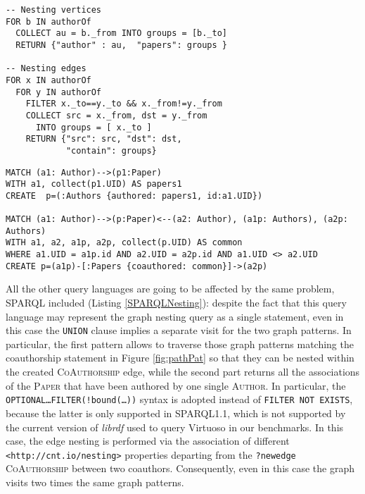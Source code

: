 \begin{lstfloat}[!t]
\begin{lstlisting}[caption={Graph Nesting in ArangoDB using AQL as a query lanugage. Please note that all the fields marked with an underscore represent externally indexed structures and. Therefore, only external indices are used within the query plan.},language=AQL,frameround=fttt,frame=trBL,tabsize=2,mathescape=true,label=AQLQueryNesting]
-- Nesting vertices
FOR b IN authorOf 
  COLLECT au = b._from INTO groups = [b._to] 
  RETURN {"author" : au,  "papers": groups }
	
-- Nesting edges
FOR x IN authorOf 
  FOR y IN authorOf 
    FILTER x._to==y._to && x._from!=y._from 
    COLLECT src = x._from, dst = y._from 
      INTO groups = [ x._to ] 
    RETURN {"src": src, "dst": dst, 
            "contain": groups}
\end{lstlisting}
	
\begin{lstlisting}[caption={Graph Nesting in Neo4J using Cypher as a Query Language. Please note that, even in this case, is it not possible to return one single nested graph immediately, and hence the nested vertices must be created before creating the nested edges. This implies that a greater number of joins is required to associate the previously nested data to the original operand.},language=Cypher,frameround=fttt,frame=trBL,mathescape=true,label=Neo4JQuery]
MATCH (a1: Author)-->(p1:Paper) 
WITH a1, collect(p1.UID) AS papers1 
CREATE  p=(:Authors {authored: papers1, id:a1.UID})
	
MATCH (a1: Author)-->(p:Paper)<--(a2: Author), (a1p: Authors), (a2p: Authors)
WITH a1, a2, a1p, a2p, collect(p.UID) AS common
WHERE a1.UID = a1p.id AND a2.UID = a2p.id AND a1.UID <> a2.UID
CREATE p=(a1p)-[:Papers {coauthored: common}]->(a2p)
\end{lstlisting}
\end{lstfloat}


All the other query languages are going to be affected by the same problem, SPARQL included (Listing \ref{SPARQLNesting}): despite the fact that this query language may represent the graph nesting query as a single statement, even in this case the \texttt{UNION} clause implies a separate visit for the two graph patterns. In particular, the first pattern allows to traverse those graph patterns matching the coauthorship statement in Figure \ref{fig:pathPat} so that they can be nested within the created \textsc{CoAuthorship} edge, while the second part returns all the associations of the \textsc{Paper} that have been authored by one single \textsc{Author}. In particular, the \texttt{OPTIONAL\dots FILTER(!bound(\dots))} syntax is adopted instead of \texttt{FILTER NOT EXISTS}, because the latter is only supported in SPARQL1.1, which is not supported by the current version of \textit{librdf} used to query Virtuoso in our benchmarks. In this case, the edge nesting is performed via the association of different \texttt{<http://cnt.io/nesting>} properties departing from the \texttt{?newedge}  \textsc{CoAuthorship} between two coauthors. Consequently, even in this case the graph visits two times the same graph patterns.

